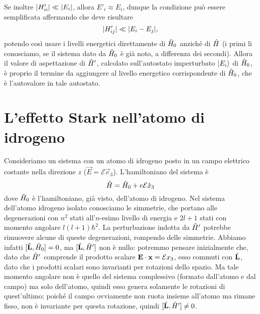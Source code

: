 Se inoltre $\lvert H'_{ii}\rvert\ll\lvert E_i\rvert$, allora $E'_i\approx E_i$, dunque la condizione può essere semplificata affermando che deve risultare
\begin{equation}
	\lvert H'_{ij}\rvert\ll\lvert E_i-E_j\rvert,
	\label{eq:condizione-approssimazione-perturbazione-2d}
\end{equation}
potendo cos\`i usare i livelli energetici direttamente di $\hat{H}_0$ anzich\'e di $\hat{H}$ (i primi li conosciamo, se il sistema dato da $\hat{H}_0$ è già noto, a differenza dei secondi).
Allora il valore di aspettazione di $\hat{H}'$, calcolato sull'autostato imperturbato $\lvert E_i\rangle$ di $\hat{H}_0$, è proprio il termine da aggiungere al livello energetico corrispondente di $\hat{H}_0$, che è l'autovalore in tale autostato.

\section{L'effetto Stark nell'atomo di idrogeno}
Consideriamo un sistema con un atomo di idrogeno posto in un campo elettrico costante nella direzione $z$ ($\vec E=\mathcal E\vec e_3$).
L'hamiltoniano del sistema è
\begin{equation}
	\hat{H}=\hat{H}_0+e\mathcal E\hat{x}_3
	\label{eq:hamiltoniano-stark-idrogeno}
\end{equation}
dove $\hat{H}_0$ è l'hamiltoniano, già visto, dell'atomo di idrogeno.
Nel sistema dell'atomo idrogeno isolato conosciamo le simmetrie, che portano alle degenerazioni con $n^2$ stati all'$n$-esimo livello di energia e $2l+1$ stati con momento angolare $l(l+1)\hbar^2$.
La perturbazione indotta da $\hat{H}'$ potrebbe rimuovere alcune di queste degenerazioni, rompendo delle simmetrie.
Abbiamo infatti $[\hat{\mathbf{L}},\hat{H}_0]=0$, ma $[\hat{\mathbf{L}},\hat{H}']$ non è nullo: potremmo pensare inizialmente che, dato che $\hat{H}'$ comprende il prodotto scalare ${\mathbf{E}}\cdot{\mathbf{x}}=\mathcal Ex_3$, esso commuti con $\hat{\mathbf{L}}$, dato che i prodotti scalari sono invarianti per rotazioni dello spazio.
Ma tale momento angolare non è quello del sistema complessivo (formato dall'atomo e dal campo) ma solo dell'atomo, quindi esso genera solamente le rotazioni di quest'ultimo; poich\'e il campo ovviamente non ruota insieme all'atomo ma rimane fisso, non è invariante per questa rotazione, quindi $[\hat{\mathbf{L}},\hat{H}']\ne 0$.

